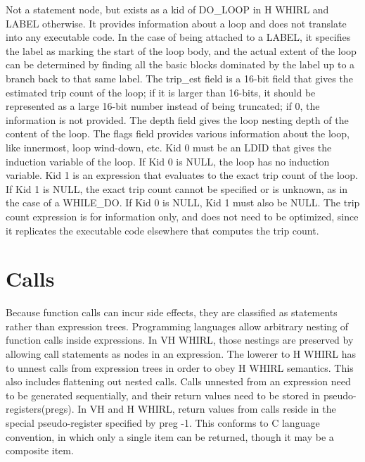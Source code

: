 \begin{itemize}
Not a statement node, but exists as a kid of 
%
DO\_LOOP in H WHIRL
and 
%
LABEL otherwise. It provides information about a loop and does
not translate into any executable code. In the case of being attached
to a 
%
LABEL, it specifies the label as marking the start of the loop
body, and the actual extent of the loop can be determined by finding
all the basic blocks
dominated by the label up to a branch back to that same label.
The trip\_est field is a 16-bit field that gives the estimated trip
count of the loop; if it is larger than 16-bits, it should be
represented as a large 16-bit number instead of being truncated; if
0, the information is not provided. The depth field gives the loop
nesting depth of the content of the loop. The flags field provides
various information about the loop, like innermost, loop wind-down,
etc. Kid 0 must be an
%
LDID that gives the induction variable of
the loop. If Kid 0 is NULL, the loop has no induction variable.
Kid 1 is an expression that evaluates to the exact trip count of         the
loop. If Kid 1 is NULL, the exact trip count cannot be specified
or is unknown, as in the case of a
%
WHILE\_DO. If Kid 0 is NULL, Kid
1 must also be NULL. The trip count expression is for information
only, and does not need to be optimized, since it replicates the
executable code elsewhere that computes the trip count.

\end{itemize}

\section{Calls}

Because function calls can incur side effects, they are classified
as statements rather than expression trees. Programming languages
allow arbitrary nesting of function calls inside expressions. In
VH WHIRL, those nestings are preserved by allowing call statements
as nodes in an expression. The lowerer to H WHIRL has to unnest
calls from expression trees in order to obey H WHIRL semantics. This
also includes flattening out nested calls. Calls unnested from an
expression need to be generated sequentially, 
and their return values need to be stored in
pseudo-registers(pregs). In VH and H WHIRL, return values from
calls reside in the special pseudo-register specified by preg -1.
This conforms to C language convention, in which only a single item
can be returned, though it may be a composite item.

